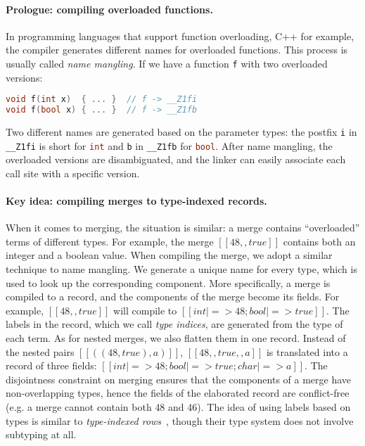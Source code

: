 \paragraph{Prologue: compiling overloaded functions.}
In programming languages that support function overloading, C++ for example, the
compiler generates different names for overloaded functions. This process is
usually called \emph{name mangling}. If we have a function \lstinline{f} with
two overloaded versions:
\begin{lstlisting}[language=C++]
void f(int x)  { ... }  // f -> __Z1fi
void f(bool x) { ... }  // f -> __Z1fb
\end{lstlisting}
Two different names are generated based on the parameter types: the postfix
\lstinline{i} in \lstinline{__Z1fi} is short for \lstinline[language=C++]{int}
and \lstinline{b} in \lstinline{__Z1fb} for \lstinline[language=C++]{bool}.
After name mangling, the overloaded versions are disambiguated, and the linker
can easily associate each call site with a specific version.

\paragraph{Key idea: compiling merges to type-indexed records.}
When it comes to merging, the situation is similar: a merge contains
``overloaded'' terms of different types. For example, the merge $[[48,,true]]$
contains both an integer and a boolean value. When compiling the merge, we adopt
a similar technique to name mangling. We generate a unique name for every type,
which is used to look up the corresponding component. More specifically, a merge
is compiled to a record, and the components of the merge become its fields. For
example, $[[48,,true]]$ will compile to $[[{int|=>48; bool|=>true}]]$. The
labels in the record, which we call \emph{type indices}, are generated from the
type of each term. As for nested merges, we also flatten them in one record.
Instead of the nested pairs $[[((48,true),a)]]$, $[[48,,true,,a]]$ is translated
into a record of three fields: $[[{int|=>48; bool|=>true; char|=>a}]]$. The
disjointness constraint on merging ensures that the components of a merge have
non-overlapping types, hence the fields of the elaborated record are
conflict-free (e.g. a merge cannot contain both \textsf{48} and \textsf{46}).
The idea of using labels based on types is similar to \emph{type-indexed
rows}~\citep{shields2001type}, though their type system does not involve
subtyping at all.

